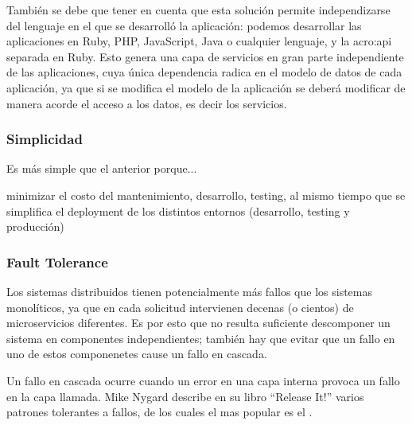 También se debe que tener en cuenta que esta solución permite independizarse del lenguaje en el que se desarrolló la aplicación: podemos desarrollar las aplicaciones en Ruby, PHP, JavaScript, Java o cualquier lenguaje, y la \gls{acro:api} separada en Ruby. Esto genera una capa de servicios en gran parte independiente de las aplicaciones, cuya única dependencia radica en el modelo de datos de cada aplicación, ya que si se modifica el modelo de la aplicación se deberá modificar de manera acorde el acceso a los datos, es decir los servicios.


\subsubsection{Simplicidad}

Es más simple que el anterior porque...

minimizar el costo del mantenimiento, desarrollo, testing, al mismo tiempo que se simplifica el deployment de los distintos entornos (desarrollo, testing y producción)

\subsubsection{Fault Tolerance}

Los sistemas distribuidos tienen potencialmente más fallos que los sistemas monolíticos, ya que en cada solicitud intervienen decenas (o cientos) de microservicios diferentes\cite[p.~48]{stin2015}. Es por esto que no resulta suficiente descomponer un sistema en componentes independientes; también hay que evitar que un fallo en uno de estos componenetes cause un fallo en cascada\cite[p.~4]{stin2015}.

Un fallo en cascada ocurre cuando un error en una capa interna provoca un fallo en la capa llamada\cite[p.~65]{nygard2007}. Mike Nygard describe en su libro ``Release It!''\cite{nygard2007} varios patrones tolerantes a fallos, de los cuales el mas popular es el .

